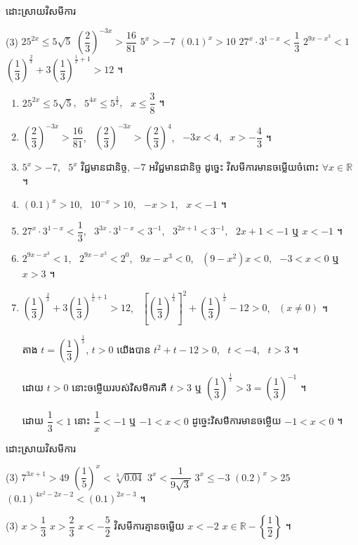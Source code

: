 \begin{example}[លំហាត់គំរូ ៣]
ដោះស្រាយវិសមីការ
\begin{tasks}(3)
  \task $25^{2x} \le 5\sqrt{5}$
  \task $\left(\dfrac{2}{3}\right)^{-3x} > \dfrac{16}{81}$
  \task $5^x > -7$
  \task $(0.1)^x > 10$
  \task $27^x \cdot 3^{1-x} < \dfrac{1}{3}$
  \task $2^{9x-x^3} < 1$
  \task $\left(\dfrac{1}{3}\right)^{\frac{2}{x}} + 3\left(\dfrac{1}{3}\right)^{\frac{1}{x}+1} > 12$ ។
\end{tasks}
\end{example}
\ans
\begin{enumerate}[a]
  \item $25^{2x} \le 5\sqrt{5}$, \ $5^{4x} \le 5^{\frac{3}{2}}$, \ $x \le \dfrac{3}{8}$ ។
  \item $\left(\dfrac{2}{3}\right)^{-3x} > \dfrac{16}{81}$, \ $\left(\dfrac{2}{3}\right)^{-3x} > \left(\dfrac{2}{3}\right)^4$, \ $-3x < 4$, \ $x > -\dfrac{4}{3}$ ។
  \item $5^x > -7$, \ $5^x$ វិជ្ជមានជានិច្ច, $-7$ អវិជ្ជមានជានិច្ច ដូច្នេះ វិសមីការមានចម្លើយចំពោះ $\forall x \in \mathbb{R}$ ។
  \item $(0.1)^x > 10$, \ $10^{-x} > 10$, \ $-x > 1$, \ $x < -1$ ។
  \item $27^x \cdot 3^{1-x} < \dfrac{1}{3}$, \ $3^{3x} \cdot 3^{1-x} < 3^{-1}$, \ $3^{2x+1} < 3^{-1}$, \ $2x + 1 < -1$ ឬ $x < -1$ ។
  \item $2^{9x-x^3} < 1$, \ $2^{9x-x^3} < 2^0$, \ $9x - x^3 < 0$, \ $(9 - x^2)x < 0$, \ $-3 < x < 0$ ឬ $x > 3$ ។
  \item $\left(\dfrac{1}{3}\right)^{\frac{2}{x}} + 3\left(\dfrac{1}{3}\right)^{\frac{1}{x}+1} > 12$, \ $\left[\left(\dfrac{1}{3}\right)^{\frac{1}{x}}\right]^2 + \left(\dfrac{1}{3}\right)^{\frac{1}{x}} - 12 > 0$, \ $(x \ne 0)$ ។

  តាង $t = \left(\dfrac{1}{3}\right)^{\frac{1}{x}}$, $t > 0$ យើងបាន $t^2 + t - 12 > 0$, \ $t < -4$, \ $t > 3$ ។

  ដោយ $t > 0$ នោះចម្លើយរបស់វិសមីការគឺ $t > 3$ ឬ $\left(\dfrac{1}{3}\right)^{\frac{1}{x}} > 3 = \left(\dfrac{1}{3}\right)^{-1}$ ។

  ដោយ $\dfrac{1}{3} < 1$ នោះ $\dfrac{1}{x} < -1$ ឬ $-1 < x < 0$ ដូច្នេះវិសមីការមានចម្លើយ $-1 < x < 0$ ។
\end{enumerate}

\begin{pro}
ដោះស្រាយវិសមីការ
\begin{tasks}(3)
  \task $7^{3x+1} > 49$
  \task $\left(\dfrac{1}{5}\right)^x < \sqrt[3]{0.04}$
  \task $3^x < \dfrac{1}{9\sqrt{3}}$
  \task $3^x \le -3$
  \task $(0.2)^x > 25$
  \task $(0.1)^{4x^2-2x-2} < (0.1)^{2x-3}$ ។
\end{tasks}
\ans
\begin{tasks}(3)
  \task $x > \dfrac{1}{3}$
  \task $x > \dfrac{2}{3}$
  \task $x < -\dfrac{5}{2}$
  \task វិសមីការគ្មានចម្លើយ
  \task $x < -2$
  \task $x \in \mathbb{R} - \left\{\dfrac{1}{2}\right\}$ ។
\end{tasks}
\end{pro}

